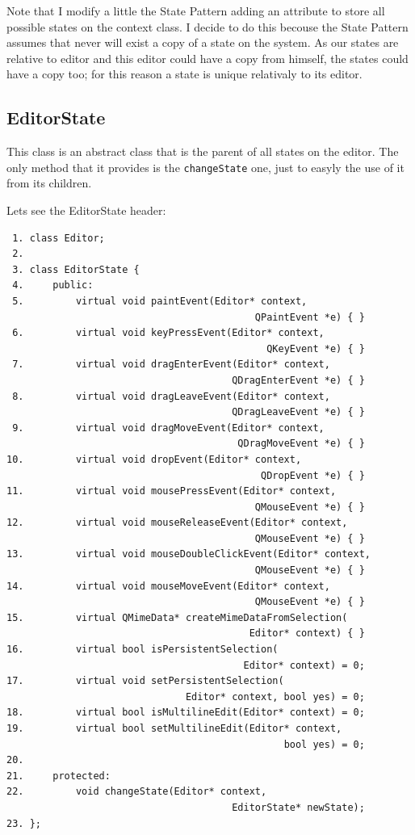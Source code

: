 \documentclass[11pt,a4paper]{report}
\begin{document}
Note that I modify a little the State Pattern adding an attribute to store all possible states on the context class. I decide to do this becouse the State Pattern assumes that never will exist a copy of a state on the system. As our states are relative to editor and this editor could have a copy from himself, the states could have a copy too; for this reason a state is unique relativaly to its editor.

\subsection{EditorState}
This class is an abstract class that is the parent of all states on the editor. The only method that it provides is the \texttt{changeState} one, just to easyly the use of it from its children.

Lets see the EditorState header:

\begin{verbatim}
 1. class Editor;
 2. 
 3. class EditorState {
 4.     public:
 5.         virtual void paintEvent(Editor* context, 
                                           QPaintEvent *e) { }
 6.         virtual void keyPressEvent(Editor* context, 
                                             QKeyEvent *e) { }
 7.         virtual void dragEnterEvent(Editor* context, 
                                       QDragEnterEvent *e) { }
 8.         virtual void dragLeaveEvent(Editor* context, 
                                       QDragLeaveEvent *e) { }
 9.         virtual void dragMoveEvent(Editor* context, 
                                        QDragMoveEvent *e) { }
10.         virtual void dropEvent(Editor* context, 
                                            QDropEvent *e) { }
11.         virtual void mousePressEvent(Editor* context, 
                                           QMouseEvent *e) { }
12.         virtual void mouseReleaseEvent(Editor* context, 
                                           QMouseEvent *e) { }
13.         virtual void mouseDoubleClickEvent(Editor* context, 
                                           QMouseEvent *e) { }
14.         virtual void mouseMoveEvent(Editor* context, 
                                           QMouseEvent *e) { }
15.         virtual QMimeData* createMimeDataFromSelection(
                                          Editor* context) { }
16.         virtual bool isPersistentSelection(
                                         Editor* context) = 0;
17.         virtual void setPersistentSelection(
                               Editor* context, bool yes) = 0;
18.         virtual bool isMultilineEdit(Editor* context) = 0;
19.         virtual bool setMultilineEdit(Editor* context, 
                                                bool yes) = 0;
20. 
21.     protected:
22.         void changeState(Editor* context, 
                                       EditorState* newState);
23. };
\end{verbatim}
\end{document}
